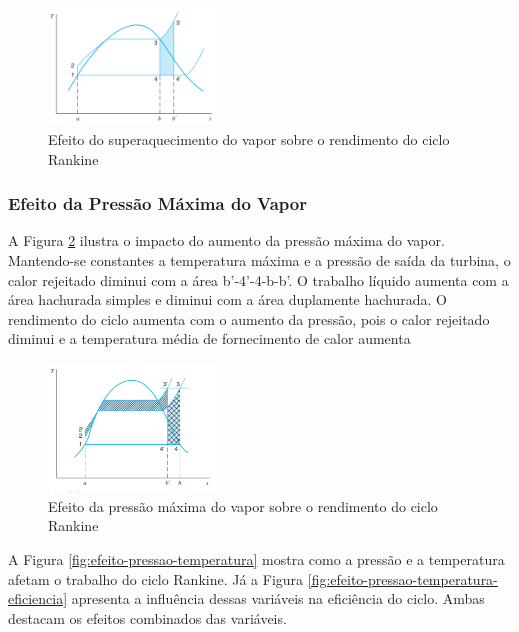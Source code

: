 \documentclass[
	article,			%
	11pt,				%
	oneside,			%
	a4paper,			%
	english,			%
	brazil,				%
	sumario=tradicional
	]{abntex2}
\begin{document}
\begin{figure}[h]
	\centering
	\includegraphics[width=0.4\textwidth]{./images/efeito-vapor.png}
	\caption{Efeito do superaquecimento do vapor sobre o rendimento do ciclo Rankine}
	\label{fig:efeito-vapor}
\end{figure}

\subsubsection{Efeito da Pressão Máxima do Vapor}

A Figura \ref{fig:efeito-max-vapor} ilustra o impacto do aumento da pressão máxima do vapor. Mantendo-se constantes a temperatura máxima e a pressão de saída da turbina, o calor rejeitado diminui com a área b'-4'-4-b-b'. O trabalho líquido aumenta com a área hachurada simples e diminui com a área duplamente hachurada. O rendimento do ciclo aumenta com o aumento da pressão, pois o calor rejeitado diminui e a temperatura média de fornecimento de calor aumenta

\begin{figure}[h]
	\centering
	\includegraphics[width=0.4\textwidth]{./images/efeito-max-vapor.png}
	\caption{Efeito da pressão máxima do vapor sobre o rendimento do ciclo Rankine}
	\label{fig:efeito-max-vapor}
\end{figure}

A Figura \ref{fig:efeito-pressao-temperatura} mostra como a pressão e a temperatura afetam o trabalho do ciclo Rankine. Já a Figura \ref{fig:efeito-pressao-temperatura-eficiencia} apresenta a influência dessas variáveis na eficiência do ciclo. Ambas destacam os efeitos combinados das variáveis.
\end{document}
